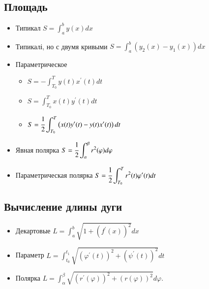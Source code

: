 \documentclass[twoside, a4paperpt]{extarticle}
\begin{document}
\subsection*{Площадь}
\begin{itemize}

    \item  Типикал $S=\displaystyle \int_{a}^{b} y(x) d x$

    \item  Типикалі, но с двумя кривыми $S=\displaystyle \int_{a}^{b}\left(y_{2}(x)-y_{1}(x)\right) d x$

    \item  Параметрическое

    \begin{itemize}
        \item $ S=-\displaystyle \int_{T_{0}}^{T} y(t) x^{\prime}(t) d t $

        \item $ S=\displaystyle \int_{T_{0}}^{T} x(t) y^{\prime}(t) d t  $
    
        \item $ S=\cfrac{1}{2} \displaystyle \int_{T_{0}}^{T}\left(x(t) y^{\prime}(t)-y(t) x^{\prime}(t)\right) d t $
    \end{itemize}



    \item  Явная полярка $S=\cfrac{1}{2} \displaystyle \int_{\alpha}^{\beta} r^{2}(\varphi) d \varphi$

    \item  Параметрическая полярка $S=\cfrac{1}{2} \displaystyle \int_{T_{0}}^{T} r^{2}(t) \varphi^{\prime}(t) d t$
\end{itemize}
\subsection*{Вычисление длины дуги}
\begin{itemize}
    \item  Декартовые $L=\displaystyle \int_{a}^{b} \sqrt{1+\left(f^{\prime}(x)\right)^{2}} d x$
    \item  Параметр $L=\displaystyle \int_{t_{0}}^{t_{1}} \sqrt{\left(\varphi^{\prime}(t)\right)^{2}+\left(\psi^{\prime}(t)\right)^{2}} d t$
    \item  Полярка $L=\displaystyle \int_{\alpha}^{\beta} \sqrt{\left(r^{\prime}(\varphi)\right)^{2}+(r(\varphi))^{2}} d \varphi .$
\end{itemize}
\end{document}
